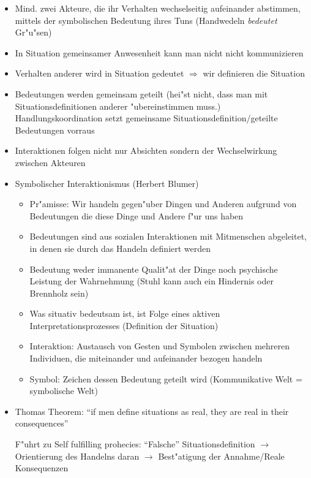 \begin{itemize}
	\item
		Mind. zwei Akteure, die ihr Verhalten wechselseitig aufeinander abstimmen, mittels der symbolischen Bedeutung ihres Tuns (Handwedeln \textit{bedeutet} Gr"u"sen)
	\item
		In Situation gemeinsamer Anwesenheit kann man nicht nicht kommunizieren
	\item
		Verhalten anderer wird in Situation gedeutet $\Rightarrow$ wir definieren die Situation
	\item
		Bedeutungen werden gemeinsam geteilt (hei"st nicht, dass man mit Situationsdefinitionen anderer "ubereinstimmen muss.) Handlungskoordination setzt gemeinsame Situationsdefinition/geteilte Bedeutungen vorraus
	\item
		Interaktionen folgen nicht nur Absichten sondern der Wechselwirkung zwischen Akteuren
	\item
		Symbolischer Interaktionismus (Herbert Blumer) 
		\begin{itemize}
			\item
				Pr"amisse: Wir handeln gegen"uber Dingen und Anderen aufgrund von Bedeutungen die diese Dinge und Andere f"ur uns haben
			\item
				Bedeutungen sind aus sozialen Interaktionen mit Mitmenschen abgeleitet, in denen sie durch das Handeln definiert werden
			\item
				Bedeutung weder immanente Qualit"at der Dinge noch psychische Leistung der Wahrnehmung (Stuhl kann auch ein Hindernis oder Brennholz sein)
			\item
				Was situativ bedeutsam ist, ist Folge eines aktiven Interpretationsprozesses (Definition der Situation)
			\item
				Interaktion: Austausch von Gesten und Symbolen zwischen mehreren Individuen, die miteinander und aufeinander bezogen handeln
			\item
				Symbol: Zeichen dessen Bedeutung geteilt wird (Kommunikative Welt = symbolische Welt)
		\end{itemize}

	\item
		Thomas Theorem: \enquote{if men define situations as real, they are real in their consequences} 

				F"uhrt zu Self fulfilling prohecies: \enquote{Falsche} Situationsdefinition $\rightarrow$ Orientierung des Handelns daran $\rightarrow$ Best"atigung der Annahme/Reale Konsequenzen
\end{itemize}

